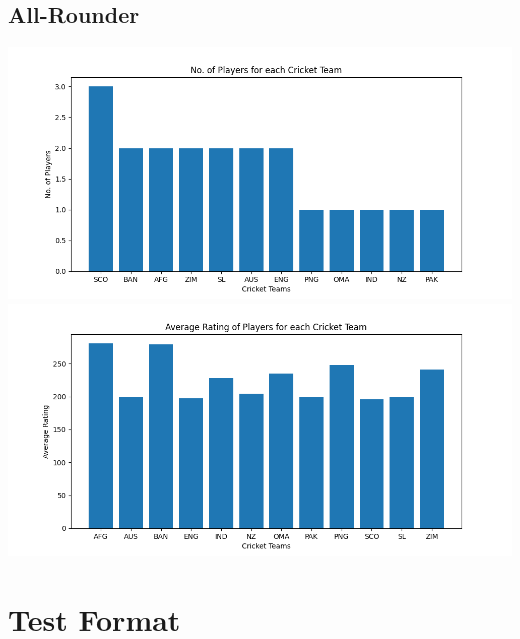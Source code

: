 \documentclass{article}
\begin{document}
\begin{normalsize}
            \subsection{All-Rounder}\label{subsec:all-rounder2}
                \includegraphics[scale=0.7]{odi_all-rounder-1}
                \vspace{1em}\\
                \includegraphics[scale=0.7]{odi_all-rounder-2}

        \vspace{2em}

        \section{Test Format}\label{sec:test-format}

\end{normalsize}
\end{document}
